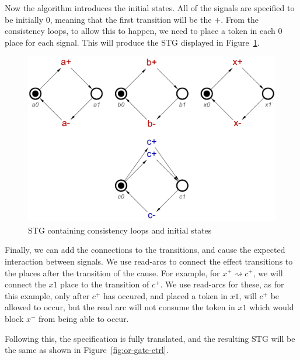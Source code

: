 \documentclass[british,conference,compsoc]{IEEEtran}
\begin{document}
Now the algorithm introduces the initial states. All of the signals are specified
to be initially 0, meaning that the first transition will be the $+$. From the
consistency loops, to allow this to happen, we need to place a token in each 
$0$ place for each signal. This will produce the STG displayed in Figure~\ref{fig:tokens}.

\begin{figure}[h]
\begin{centering}
\includegraphics[scale=0.25]{Images/or-gate-ctrl-inits-stg}
\par\end{centering}
\protect\caption{\label{fig:tokens} STG containing consistency loops and initial states}
\end{figure}

Finally, we can add the connections to the transitions, and cause the 
expected interaction between signals. We use read-arcs to connect the effect
transitions to the places after the transition of the cause. For example, for
$x^{+} \rightsquigarrow c^{+}$, we will connect the $x1$ place to the 
transition of $c^{+}$. We use read-arcs for these, as for this example, only
after $c^{+}$ has occured, and placed a token in $x1$, will $c^{+}$ be allowed
to occur, but the read arc will not consume the token in $x1$ which would block
$x^{-}$ from being able to occur. 

Following this, the specification is fully translated, and the resulting STG will
be the same as shown in Figure~\ref{fig:or-gate-ctrl}.


\end{document}
